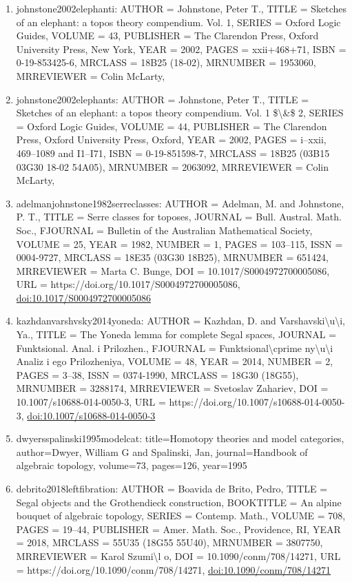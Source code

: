 \documentclass[11pt]{article}
\begin{document}
\begin{enumerate}[leftmargin=*]
  \item johnstone2002elephanti: AUTHOR = Johnstone, Peter T., TITLE = Sketches of an elephant: a topos theory compendium. Vol. 1, SERIES = Oxford Logic Guides, VOLUME = 43, PUBLISHER = The Clarendon Press, Oxford University Press, New York, YEAR = 2002, PAGES = xxii+468+71, ISBN = 0-19-853425-6, MRCLASS = 18B25 (18-02), MRNUMBER = 1953060, MRREVIEWER = Colin McLarty,
  \item johnstone2002elephants: AUTHOR = Johnstone, Peter T., TITLE = Sketches of an elephant: a topos theory compendium. Vol. 1 \$\textbackslash{}\&\$ 2, SERIES = Oxford Logic Guides, VOLUME = 44, PUBLISHER = The Clarendon Press, Oxford University Press, Oxford, YEAR = 2002, PAGES = i--xxii, 469--1089 and I1--I71, ISBN = 0-19-851598-7, MRCLASS = 18B25 (03B15 03G30 18-02 54A05), MRNUMBER = 2063092, MRREVIEWER = Colin McLarty,
  \item adelmanjohnstone1982serreclasses: AUTHOR = Adelman, M. and Johnstone, P. T., TITLE = Serre classes for toposes, JOURNAL = Bull. Austral. Math. Soc., FJOURNAL = Bulletin of the Australian Mathematical Society, VOLUME = 25, YEAR = 1982, NUMBER = 1, PAGES = 103--115, ISSN = 0004-9727, MRCLASS = 18E35 (03G30 18B25), MRNUMBER = 651424, MRREVIEWER = Marta C. Bunge, DOI = 10.1017/S0004972700005086, URL = https://doi.org/10.1017/S0004972700005086, \href{https://doi.org/10.1017/S0004972700005086}{doi:10.1017/S0004972700005086}
  \item kazhdanvarshvsky2014yoneda: AUTHOR = Kazhdan, D. and Varshavski\textbackslash{}u\textbackslash{}i, Ya., TITLE = The Yoneda lemma for complete Segal spaces, JOURNAL = Funktsional. Anal. i Prilozhen., FJOURNAL = Funktsional\textbackslash{}cprime ny\textbackslash{}u\textbackslash{}i Analiz i ego Prilozheniya, VOLUME = 48, YEAR = 2014, NUMBER = 2, PAGES = 3--38, ISSN = 0374-1990, MRCLASS = 18G30 (18G55), MRNUMBER = 3288174, MRREVIEWER = Svetoslav Zahariev, DOI = 10.1007/s10688-014-0050-3, URL = https://doi.org/10.1007/s10688-014-0050-3, \href{https://doi.org/10.1007/s10688-014-0050-3}{doi:10.1007/s10688-014-0050-3}
  \item dwyersspalinski1995modelcat: title=Homotopy theories and model categories, author=Dwyer, William G and Spalinski, Jan, journal=Handbook of algebraic topology, volume=73, pages=126, year=1995
  \item debrito2018leftfibration: AUTHOR = Boavida de Brito, Pedro, TITLE = Segal objects and the Grothendieck construction, BOOKTITLE = An alpine bouquet of algebraic topology, SERIES = Contemp. Math., VOLUME = 708, PAGES = 19--44, PUBLISHER = Amer. Math. Soc., Providence, RI, YEAR = 2018, MRCLASS = 55U35 (18G55 55U40), MRNUMBER = 3807750, MRREVIEWER = Karol Szumi\textbackslash{}l o, DOI = 10.1090/conm/708/14271, URL = https://doi.org/10.1090/conm/708/14271, \href{https://doi.org/10.1090/conm/708/14271}{doi:10.1090/conm/708/14271}

\end{enumerate}
\end{document}
